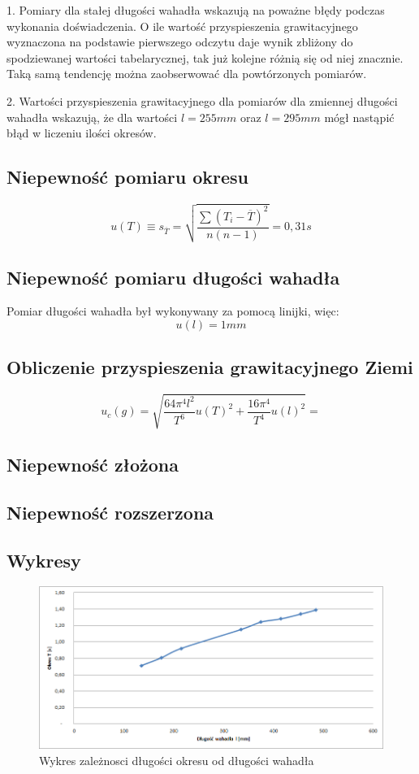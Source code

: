 \documentclass[a4paper,10pt,twoside]{article}
\begin{document}
1. Pomiary dla stałej długości wahadła wskazują na poważne błędy podczas wykonania doświadczenia. O ile wartość przyspieszenia grawitacyjnego wyznaczona na podstawie pierwszego odczytu daje wynik zbliżony do spodziewanej wartości tabelarycznej, tak już kolejne różnią się od niej znacznie. Taką samą tendencję można zaobserwować dla powtórzonych pomiarów.

2. Wartości przyspieszenia grawitacyjnego dla pomiarów dla zmiennej długości wahadła wskazują, że dla wartości $l=255mm$ oraz $l=295mm$ mógł nastąpić błąd w liczeniu ilości okresów.

\subsection{Niepewność pomiaru okresu}
$$u(T)\equiv s_{\overline{T}} = \sqrt{\frac{\sum{(T_i-\overline{T})^2}}{n(n-1)}} = 0,31s $$
\subsection{Niepewność pomiaru długości wahadła}
Pomiar długości wahadła był wykonywany za pomocą linijki, więc:
$$u(l)=1mm$$
\subsection{Obliczenie przyspieszenia grawitacyjnego Ziemi}
$$u_c(g)=\sqrt{\frac{64\pi^4 l^2}{T^6}u(T)^2+\frac{16\pi^4}{T^4}u(l)^2} =  $$
\subsection{Niepewność złożona}
\subsection{Niepewność rozszerzona}

\subsection{Wykresy}

\begin{figure}[!htp]
\centerline{\includegraphics[scale=1]{wykres1.png}}
\caption{Wykres zależnosci długości okresu od długości wahadła}
\label{fig:tl}
\end{figure}
\end{document}
